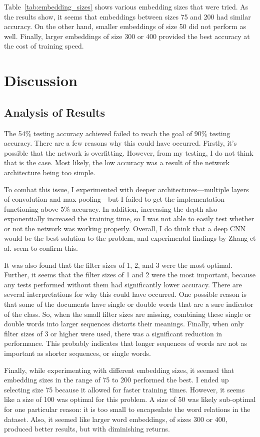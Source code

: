 \documentclass{article}
\begin{document}
Table~\ref{tab:embedding_sizes} shows various embedding sizes that were tried.
As the results show, it seems that embeddings between sizes 75 and 200 had similar accuracy. On the other hand, smaller embeddings of
size 50 did not perform as well. Finally, larger embeddings of size 300 or 400 provided the best accuracy at the cost of training speed.

\section{Discussion}
\subsection{Analysis of Results}
The 54\% testing accuracy achieved failed to reach the goal of 90\% testing accuracy. There are a few reasons why this could have occurred.
Firstly, it's possible that the network is overfitting. However, from my testing, I do not think that is the case. Most likely, the low
accuracy was a result of the network architecture being too simple.

To combat this issue, I experimented with deeper architectures—multiple layers of convolution and max pooling—but I failed to get the
implementation functioning above 5\% accuracy. In addition, increasing the depth also exponentially increased the training time, so I was not
able to easily test whether or not the network was working properly. Overall, I do think that a deep CNN would be the best solution to the
problem, and experimental findings by Zhang et al. \cite{zhang} seem to confirm this.

It was also found that the filter sizes of 1, 2, and 3 were the most optimal. Further, it seems that the filter sizes of 1 and 2 were the most
important, because any tests performed without them had significantly lower accuracy. There are several interpretations for why this could
have occurred. One possible reason is that some of the documents have single or double words that are a sure indicator of the class. So, when the
small filter sizes are missing, combining these single or double words into larger sequences distorts their meanings. Finally, when only filter sizes
of 3 or higher were used, there was a significant reduction in performance. This probably indicates that longer sequences of words are not as
important as shorter sequences, or single words.

Finally, while experimenting with different embedding sizes, it seemed that embedding sizes in the range of 75 to 200 performed the best. I ended up
selecting size 75 because it allowed for faster training times. However, it seems like a size of 100 was optimal for this problem. A size of
50 was likely sub-optimal for one particular reason: it is too small to encapsulate the word relations in the dataset. Also, it seemed like
larger word embeddings, of sizes 300 or 400, produced better results, but with diminishing returns.
\end{document}
